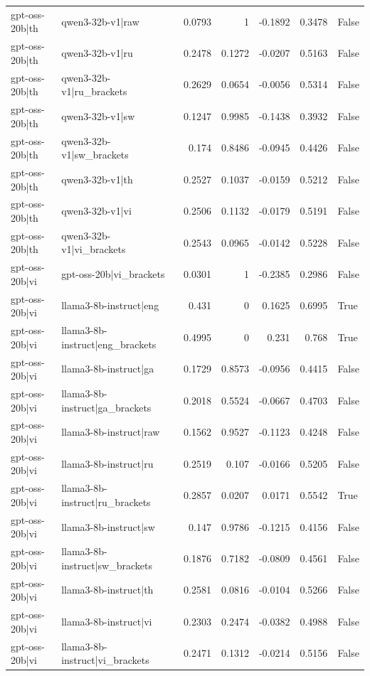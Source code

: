 \begin{table}
\begin{tabular}{l l r r r r l}
gpt-oss-20b|th & qwen3-32b-v1|raw & 0.0793 & 1 & -0.1892 & 0.3478 & False \\
gpt-oss-20b|th & qwen3-32b-v1|ru & 0.2478 & 0.1272 & -0.0207 & 0.5163 & False \\
gpt-oss-20b|th & qwen3-32b-v1|ru_brackets & 0.2629 & 0.0654 & -0.0056 & 0.5314 & False \\
gpt-oss-20b|th & qwen3-32b-v1|sw & 0.1247 & 0.9985 & -0.1438 & 0.3932 & False \\
gpt-oss-20b|th & qwen3-32b-v1|sw_brackets & 0.174 & 0.8486 & -0.0945 & 0.4426 & False \\
gpt-oss-20b|th & qwen3-32b-v1|th & 0.2527 & 0.1037 & -0.0159 & 0.5212 & False \\
gpt-oss-20b|th & qwen3-32b-v1|vi & 0.2506 & 0.1132 & -0.0179 & 0.5191 & False \\
gpt-oss-20b|th & qwen3-32b-v1|vi_brackets & 0.2543 & 0.0965 & -0.0142 & 0.5228 & False \\
gpt-oss-20b|vi & gpt-oss-20b|vi_brackets & 0.0301 & 1 & -0.2385 & 0.2986 & False \\
gpt-oss-20b|vi & llama3-8b-instruct|eng & 0.431 & 0 & 0.1625 & 0.6995 & True \\
gpt-oss-20b|vi & llama3-8b-instruct|eng_brackets & 0.4995 & 0 & 0.231 & 0.768 & True \\
gpt-oss-20b|vi & llama3-8b-instruct|ga & 0.1729 & 0.8573 & -0.0956 & 0.4415 & False \\
gpt-oss-20b|vi & llama3-8b-instruct|ga_brackets & 0.2018 & 0.5524 & -0.0667 & 0.4703 & False \\
gpt-oss-20b|vi & llama3-8b-instruct|raw & 0.1562 & 0.9527 & -0.1123 & 0.4248 & False \\
gpt-oss-20b|vi & llama3-8b-instruct|ru & 0.2519 & 0.107 & -0.0166 & 0.5205 & False \\
gpt-oss-20b|vi & llama3-8b-instruct|ru_brackets & 0.2857 & 0.0207 & 0.0171 & 0.5542 & True \\
gpt-oss-20b|vi & llama3-8b-instruct|sw & 0.147 & 0.9786 & -0.1215 & 0.4156 & False \\
gpt-oss-20b|vi & llama3-8b-instruct|sw_brackets & 0.1876 & 0.7182 & -0.0809 & 0.4561 & False \\
gpt-oss-20b|vi & llama3-8b-instruct|th & 0.2581 & 0.0816 & -0.0104 & 0.5266 & False \\
gpt-oss-20b|vi & llama3-8b-instruct|vi & 0.2303 & 0.2474 & -0.0382 & 0.4988 & False \\
gpt-oss-20b|vi & llama3-8b-instruct|vi_brackets & 0.2471 & 0.1312 & -0.0214 & 0.5156 & False \\

\end{tabular}
\end{table}
